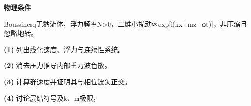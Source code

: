 \textbf{物理条件}\par Boussinesq无黏流体，浮力频率N>0，二维小扰动∝exp[i(kx+mz−ωt)]，非压缩且忽略地转。
\par\noindent\textbf{(1)} 列出线化速度、浮力与连续性系统。
\par\noindent\textbf{(2)} 消去压力推导内部重力波色散。
\par\noindent\textbf{(3)} 计算群速度并证明其与相位波矢正交。
\par\noindent\textbf{(4)} 讨论层结符号及k、m极限。
